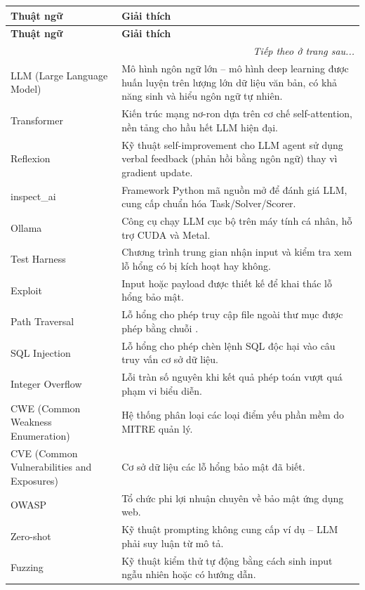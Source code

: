 \documentclass{nt521report}
\begin{document}
\begin{longtable}{l p{10cm}}
  \toprule
  \textbf{Thuật ngữ} & \textbf{Giải thích} \\
  \midrule
  \endfirsthead
  \toprule
  \textbf{Thuật ngữ} & \textbf{Giải thích} \\
  \midrule
  \endhead
  \midrule
  \multicolumn{2}{r}{\textit{Tiếp theo ở trang sau...}} \\
  \bottomrule
  \endfoot
  \bottomrule
  \endlastfoot

  LLM (Large Language Model) & Mô hình ngôn ngữ lớn -- mô hình deep learning được huấn luyện trên lượng lớn dữ liệu văn bản, có khả năng sinh và hiểu ngôn ngữ tự nhiên. \\
  Transformer & Kiến trúc mạng nơ-ron dựa trên cơ chế self-attention, nền tảng cho hầu hết LLM hiện đại. \\
  Reflexion & Kỹ thuật self-improvement cho LLM agent sử dụng verbal feedback (phản hồi bằng ngôn ngữ) thay vì gradient update. \\
  inspect\_ai & Framework Python mã nguồn mở để đánh giá LLM, cung cấp chuẩn hóa Task/Solver/Scorer. \\
  Ollama & Công cụ chạy LLM cục bộ trên máy tính cá nhân, hỗ trợ CUDA và Metal. \\
  Test Harness & Chương trình trung gian nhận input và kiểm tra xem lỗ hổng có bị kích hoạt hay không. \\
  Exploit & Input hoặc payload được thiết kế để khai thác lỗ hổng bảo mật. \\
  Path Traversal & Lỗ hổng cho phép truy cập file ngoài thư mục được phép bằng chuỗi \code{../}. \\
  SQL Injection & Lỗ hổng cho phép chèn lệnh SQL độc hại vào câu truy vấn cơ sở dữ liệu. \\
  Integer Overflow & Lỗi tràn số nguyên khi kết quả phép toán vượt quá phạm vi biểu diễn. \\
  CWE (Common Weakness Enumeration) & Hệ thống phân loại các loại điểm yếu phần mềm do MITRE quản lý. \\
  CVE (Common Vulnerabilities and Exposures) & Cơ sở dữ liệu các lỗ hổng bảo mật đã biết. \\
  OWASP & Tổ chức phi lợi nhuận chuyên về bảo mật ứng dụng web. \\
  Zero-shot & Kỹ thuật prompting không cung cấp ví dụ -- LLM phải suy luận từ mô tả. \\
  Fuzzing & Kỹ thuật kiểm thử tự động bằng cách sinh input ngẫu nhiên hoặc có hướng dẫn. \\

\end{longtable}
\end{document}
